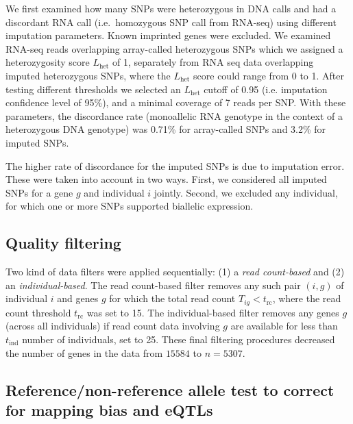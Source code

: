 \documentclass[letterpaper]{article}
\begin{document}
We first examined how many SNPs were heterozygous in DNA calls and had a
discordant RNA call (i.e.~homozygous SNP call from RNA-seq) using different imputation
parameters. Known imprinted genes were excluded. We examined RNA-seq reads
overlapping array-called heterozygous SNPs which we assigned a heterozygosity
score \(L_\mathrm{het}\) of 1, separately from RNA seq data
overlapping imputed heterozygous SNPs, where the \(L_\mathrm{het}\) score could
range from 0 to 1.  After testing different thresholds
we selected an \(L_\mathrm{het}\) cutoff of 0.95 (i.e. imputation confidence
level of 95\%), and a minimal coverage of 7 reads per SNP. With these
parameters, the discordance rate (monoallelic RNA genotype in the context of a
heterozygous DNA genotype) was 0.71\% for array-called SNPs and 3.2\% for
imputed SNPs.

The higher rate of discordance for the imputed SNPs
is due to imputation error.  These were taken into
account in two ways.
First, we considered all imputed SNPs for a gene \(g\) and individual \(i\)
jointly.  Second, we excluded
any individual, for which one or more SNPs supported biallelic
expression.


\subsection*{Quality filtering}

\label{sec:filtering}

Two kind of data filters were applied sequentially: (1) a \emph{read
count-based} and (2) an \emph{individual-based}.  The read count-based filter
removes any such pair $(i,g)$ of individual $i$ and genes $g$ for which the
total read count $T_{ig}<t_\mathrm{rc}$, where the read count threshold
$t_\mathrm{rc}$ was set to 15. The individual-based filter removes any genes
$g$ (across all individuals) if read count data involving $g$ are available
for less than $t_\mathrm{ind}$ number of individuals, set to 25.
These final filtering procedures decreased the number of genes in the data from
\(15584\) to \(n=5307\).

\subsection*{Reference/non-reference allele test to correct for mapping bias
and eQTLs}
\end{document}
